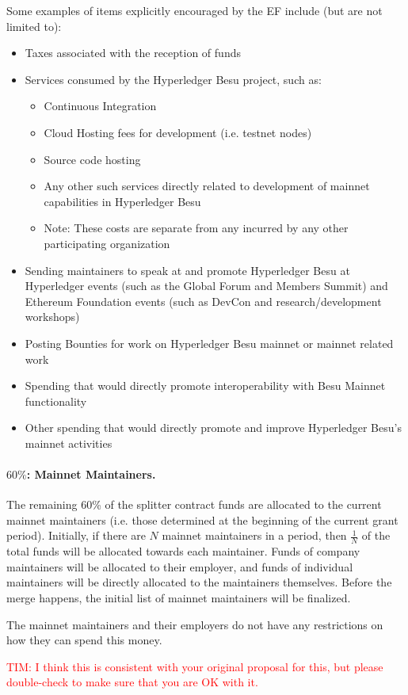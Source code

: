 \medskip
\noindent Some examples of items explicitly encouraged by the EF include (but are not limited to):
\begin{itemize}
\item Taxes associated with the reception of funds
\item Services consumed by the Hyperledger Besu project, such as:
\begin{itemize}
\item Continuous Integration
\item Cloud Hosting fees for development (i.e. testnet nodes)
\item Source code hosting
\item Any other such services directly related to development of mainnet capabilities in Hyperledger Besu
\item Note: These costs are separate from any incurred by any other participating organization
\end{itemize}
\item Sending maintainers to speak at and promote Hyperledger Besu at Hyperledger events (such as the Global Forum and Members Summit) and Ethereum Foundation events (such as DevCon and research/development workshops)
\item Posting Bounties for work on Hyperledger Besu mainnet or mainnet related work
\item Spending that would directly promote interoperability with Besu Mainnet functionality
\item Other spending that would directly promote and improve Hyperledger Besu’s mainnet activities
\end{itemize}

\paragraph{$60\%$:  \textbf{Mainnet Maintainers}.}  The remaining 60\% of the splitter contract funds are allocated to the current mainnet maintainers (i.e. those determined at the beginning of the current grant period).  Initially, if there are $N$ mainnet maintainers in a period, then $\frac{1}{N}$ of the total funds will be allocated towards each maintainer.  Funds of company maintainers will be allocated to their employer, and funds of individual maintainers will be directly allocated to the maintainers themselves.  Before the merge happens, the initial list of mainnet maintainers will be finalized.  

The mainnet maintainers and their employers do not have any restrictions on how they can spend this money.

\textcolor{red}{TIM:  I think this is consistent with your original proposal for this, but please double-check to make sure that you are OK with it.}
